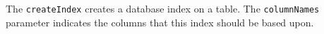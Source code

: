 The \verb+createIndex+ creates a database index on a table. The \verb+columnNames+ parameter indicates
the columns that this index should be based upon.
